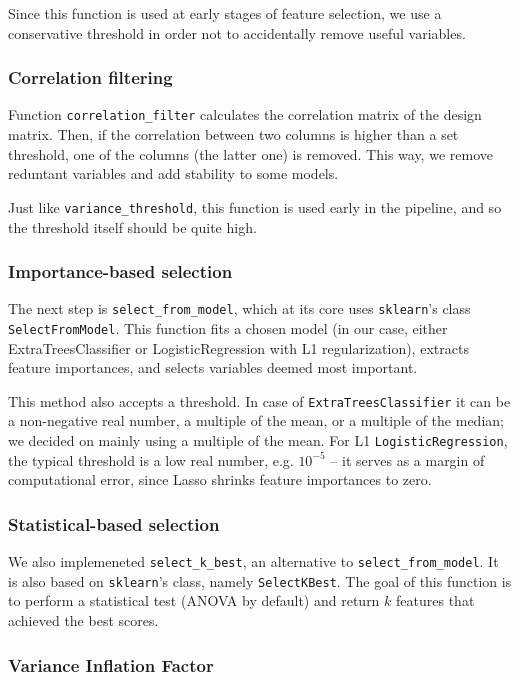 \documentclass{article}
\begin{document}
Since this function is used at early stages of feature selection, we use a conservative threshold in order not to accidentally remove useful variables.

\subsubsection{Correlation filtering}

Function \verb|correlation_filter| calculates the correlation matrix of the design matrix. Then, if the correlation between two columns is higher than a set threshold, one of the columns (the latter one) is removed. This way, we remove reduntant variables and add stability to some models.

Just like \verb|variance_threshold|, this function is used early in the pipeline, and so the threshold itself should be quite high.

\subsubsection{Importance-based selection}

The next step is \verb|select_from_model|, which at its core uses \verb|sklearn|'s class \verb|SelectFromModel|. This function fits a chosen model (in our case, either ExtraTreesClassifier or LogisticRegression with L1 regularization), extracts feature importances, and selects variables deemed most important.

This method also accepts a threshold. In case of \verb|ExtraTreesClassifier| it can be a non-negative real number, a multiple of the mean, or a multiple of the median; we decided on mainly using a multiple of the mean. For L1 \verb|LogisticRegression|, the typical threshold is a low real number, e.g. $10^{-5}$ -- it serves as a margin of computational error, since Lasso shrinks feature importances to zero.

\subsubsection{Statistical-based selection}

We also implemeneted \verb|select_k_best|, an alternative to \verb|select_from_model|. It is also based on \verb|sklearn|'s class, namely \verb|SelectKBest|. The goal of this function is to perform a statistical test (ANOVA by default) and return $k$ features that achieved the best scores.

\subsubsection{Variance Inflation Factor}
\end{document}
